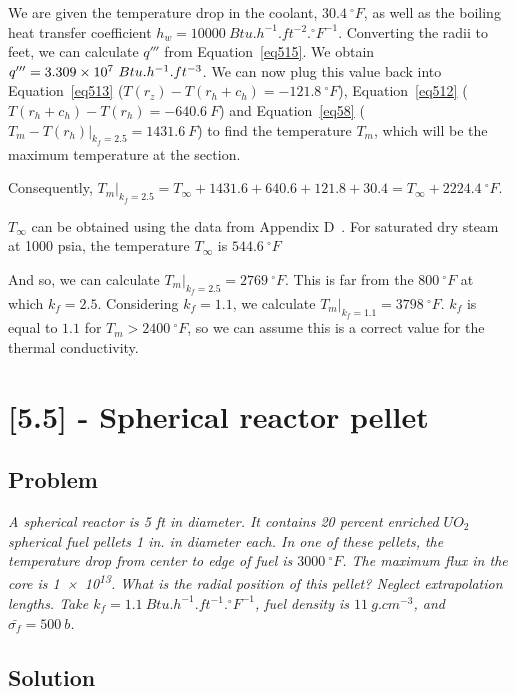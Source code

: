 We are given the temperature drop in the coolant, $30.4\ {}^\circ F$, as well as the boiling heat transfer coefficient $h_w = 10000\ Btu.h^{-1}.ft^{-2}.{}^\circ F^{-1}$. Converting the radii to feet, we can calculate $q'''$ from Equation~\ref{eq515}. We obtain $q''' = \text{\num{3.309e7}}\ Btu.h^{-1}.ft^{-3}$. We can now plug this value back into Equation~\ref{eq513} ($T(r_z)-T(r_h+c_h) = -121.8\ {}^\circ F$), Equation~\ref{eq512} ($T(r_h+c_h)-T(r_h) = -640.6\ F$) and Equation~\ref{eq58} ($T_m - T(r_h) \bigg\rvert_{k_f = 2.5} = 1431.6\ F$) to find the temperature $T_m$, which will be the maximum temperature at the section.

Consequently, $T_m\bigg\rvert_{k_f = 2.5} = T_{\infty} + 1431.6 + 640.6 + 121.8 + 30.4 = T_{\infty} + 2224.4\ {}^\circ F$.

$T_{\infty}$ can be obtained using the data from Appendix D~\cite{book01}. For saturated dry steam at 1000 psia, the temperature $T_{\infty}$ is $544.6\ {}^\circ F$

And so, we can calculate $T_m\bigg\rvert_{k_f = 2.5} = 2769\ {}^\circ F$. This is far from the $800\ {}^\circ F$ at which $k_f = 2.5$. Considering $k_f = 1.1$, we calculate $T_m\bigg\rvert_{k_f = 1.1} = 3798\ {}^\circ F$. $k_f$ is equal to $1.1$ for $T_m > 2400\ {}^\circ F$, so we can assume this is a correct value for the thermal conductivity.

\section{[5.5] - Spherical reactor pellet}
\label{prob52}

\subsection{Problem}
\textit{A spherical reactor is 5 ft in diameter. It contains 20 percent enriched $UO_2$ spherical fuel pellets 1 in. in diameter each. In one of these pellets, the temperature drop from center to edge of fuel is $3000\ {}^\circ F$. The maximum flux in the core is \num{1e13}. What is the radial position of this pellet? Neglect extrapolation lengths. Take $k_f = 1.1\ Btu.h^{-1}.ft^{-1}.{}^\circ F^{-1}$, fuel density is $11\ g.cm^{-3}$, and $\bar{\sigma_f} = 500\ b$.}

\subsection{Solution}

